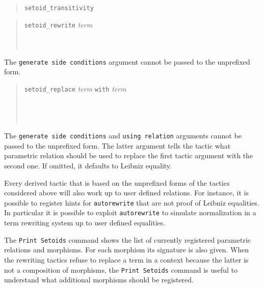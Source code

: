 \begin{quote}
  \texttt{setoid\_transitivity}
\end{quote}

\begin{quote}
  \texttt{setoid\_rewrite}  \textit{term}\\
  ~\\
  ~\\
\end{quote}

The \texttt{generate side conditions} argument cannot be passed to the
unprefixed form.

\begin{quote}
  \texttt{setoid\_replace} \textit{term} \texttt{with} \textit{term}
  ~\\
  ~\\
  ~\\
  ~
\end{quote}

The  \texttt{generate  side  conditions} and  \texttt{using  relation}
arguments cannot be passed to the unprefixed form. The latter argument
tells the  tactic what parametric  relation should be used  to replace
the first tactic argument with the second one. If omitted, it defaults
to Leibniz equality.

Every derived tactic that is based on the unprefixed forms of the tactics
considered above will also work up to user defined relations. For instance,
it is possible to register hints for \texttt{autorewrite} that are
not proof of Leibniz equalities. In particular it is possible to exploit
\texttt{autorewrite} to simulate normalization in a term rewriting system
up to user defined equalities.

The \texttt{Print Setoids} command shows the list of currently registered
parametric relations and morphisms. For each morphism its signature is also
given. When the rewriting tactics refuse to replace a term in a context
because the latter is not a composition of morphisms, the \texttt{Print Setoids}
command is useful to understand what additional morphisms should be registered.


